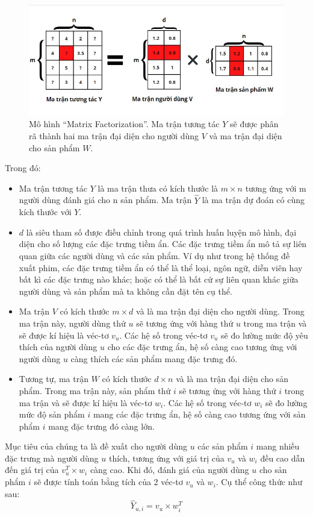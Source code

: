 \begin{figure}[h]
    \centering
    \includegraphics[width = \textwidth]{images/Chapter2/MF1.jpg}
    \caption{Mô hình ``Matrix Factorization''. Ma trận tương tác $Y$ sẽ được phân rã thành hai ma trận đại diện cho người dùng $V$ và ma trận đại diện cho sản phẩm $W$.}
    \label{fig:chap2_MF1}
\end{figure}
Trong đó:
\begin{itemize}
    \item Ma trận tương tác $Y$ là ma trận thưa có kích thước là $m \times n$ tương ứng với m người dùng đánh giá cho n sản phẩm. Ma trận $\hat{Y}$ là ma trận dự đoán có cùng kích thước với $Y$.
    \item $d$ là siêu tham số được điều chỉnh trong quá trình huấn luyện mô hình, đại diện cho số lượng các đặc trưng tiềm ẩn. Các đặc trưng tiềm ẩn mô tả sự liên quan giữa các người dùng và các sản phẩm. Ví dụ như trong hệ thống đề xuất phim, các đặc trưng tiềm ẩn có thể là thể loại, ngôn ngữ, diễn viên hay bất kì các đặc trưng nào khác; hoặc có thể là bất cứ sự liên quan khác giữa người dùng và sản phẩm mà ta không cần đặt tên cụ thể.
    \item Ma trận $V$ có kích thước $m \times d$ và là ma trận đại diện cho người dùng. Trong ma trận này, người dùng thứ $u$ sẽ tương ứng với hàng thứ $u$ trong ma trận và sẽ được kí hiệu là véc-tơ $v_u$. Các hệ số trong véc-tơ $v_u$ sẽ đo lường mức độ yêu thích của người dùng $u$ cho các đặc trưng ẩn, hệ số càng cao tương ứng với người dùng $u$ càng thích các sản phẩm mang đặc trưng đó.
 
    \item Tương tự, ma trận $W$ có kích thước $d \times n$ và là ma trận đại diện cho sản phẩm. Trong ma trận này, sản phẩm thứ $i$ sẽ tương ứng với hàng thứ $i$ trong ma trận và sẽ được kí hiệu là véc-tơ $w_i$. Các hệ số trong véc-tơ $w_i$ sẽ đo lường mức độ sản phẩm $i$ mang các đặc trưng ẩn, hệ số càng cao tương ứng với sản phẩm $i$ mang đặc trưng đó càng lớn.
\end{itemize}
Mục tiêu của chúng ta là đề xuất cho người dùng $u$ các sản phẩm $i$ mang nhiều đặc trưng mà người dùng $u$ thích, tương ứng với giá trị của $v_u$ và $w_i$ đều cao dẫn đến giá trị của $v_u^T\times w_{i}$ càng cao. Khi đó, đánh giá của người dùng $u$ cho sản phẩm $i$ sẽ được tính toán bằng tích của 2 véc-tơ $v_u$ và $w_i$. Cụ thể công thức như sau:
\begin{equation}
\label{eq:2.1_yui_nonbias}
    \hat{Y}_{u,i} = v_{u} \times w_i^T
\end{equation}

